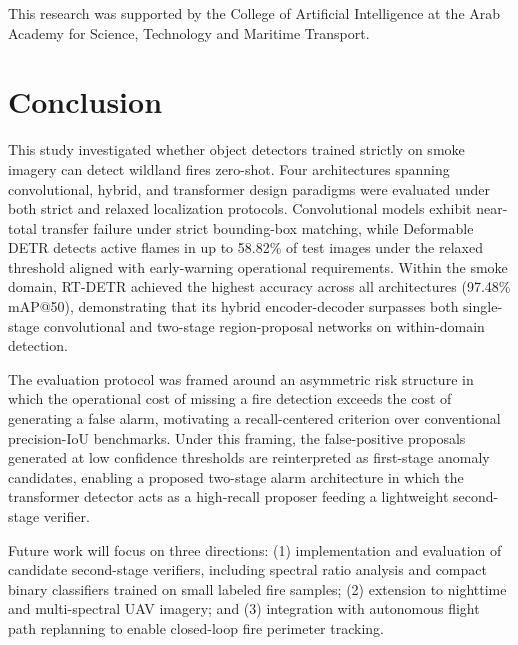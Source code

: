 \documentclass[conference]{IEEEtran}
\begin{document}
This research was supported by the College of Artificial Intelligence at the Arab Academy for Science, Technology and Maritime Transport.

\section{Conclusion}
This study investigated whether object detectors trained strictly on smoke imagery can detect wildland fires zero-shot. Four architectures spanning convolutional, hybrid, and transformer design paradigms were evaluated under both strict and relaxed localization protocols. Convolutional models exhibit near-total transfer failure under strict bounding-box matching, while Deformable DETR detects active flames in up to 58.82\% of test images under the relaxed threshold aligned with early-warning operational requirements. Within the smoke domain, RT-DETR achieved the highest accuracy across all architectures (97.48\% mAP@50), demonstrating that its hybrid encoder-decoder surpasses both single-stage convolutional and two-stage region-proposal networks on within-domain detection.

The evaluation protocol was framed around an asymmetric risk structure in which the operational cost of missing a fire detection exceeds the cost of generating a false alarm, motivating a recall-centered criterion over conventional precision-IoU benchmarks. Under this framing, the false-positive proposals generated at low confidence thresholds are reinterpreted as first-stage anomaly candidates, enabling a proposed two-stage alarm architecture in which the transformer detector acts as a high-recall proposer feeding a lightweight second-stage verifier.

Future work will focus on three directions: (1) implementation and evaluation of candidate second-stage verifiers, including spectral ratio analysis and compact binary classifiers trained on small labeled fire samples; (2) extension to nighttime and multi-spectral UAV imagery; and (3) integration with autonomous flight path replanning to enable closed-loop fire perimeter tracking.
\end{document}
